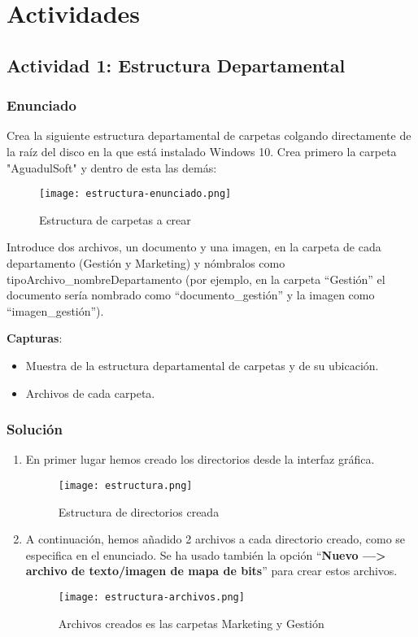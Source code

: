 \section{Actividades}

\subsection{Actividad 1: Estructura Departamental}
\subsubsection{Enunciado}

Crea la siguiente estructura departamental de carpetas colgando directamente de la raíz del disco en la que está instalado Windows 10. Crea primero la carpeta "AguadulSoft" y dentro de esta las demás:

    \begin{figure}[H]
    \centering
    \texttt{[image: estructura-enunciado.png]}
    \caption{Estructura de carpetas a crear}
\end{figure}

Introduce dos archivos, un documento y una imagen, en la carpeta de cada departamento (Gestión y Marketing) y nómbralos como tipoArchivo\_nombreDepartamento (por ejemplo, en la carpeta ``Gestión'' el documento sería nombrado como ``documento\_gestión'' y la imagen como ``imagen\_gestión'').

\textbf{Capturas}:

\begin{itemize}
    \item Muestra de la estructura departamental de carpetas y de su ubicación.
    \item Archivos de cada carpeta.
\end{itemize}

\subsubsection{Solución}
\begin{enumerate}
    \item En primer lugar hemos creado los directorios desde la interfaz gráfica.

    \begin{figure}[H]
        \centering
        \texttt{[image: estructura.png]}
        \caption{Estructura de directorios creada}
    \end{figure}

    \item A continuación, hemos añadido 2 archivos a cada directorio creado, como se especifica en el enunciado. Se ha usado también la opción ``\textbf{Nuevo ---> archivo de texto/imagen de mapa de bits}'' para crear estos archivos.

    \begin{figure}[H]
        \centering
        \texttt{[image: estructura-archivos.png]}
        \caption{Archivos creados es las carpetas Marketing y Gestión}
    \end{figure}
\end{enumerate}

